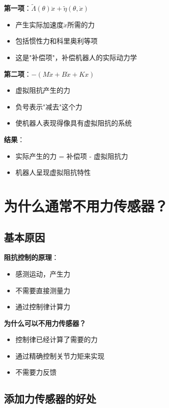 \documentclass[12pt,a4paper]{article}
\begin{document}
\textbf{第一项}：$\tilde{\Lambda}(\theta)\ddot{x} + \tilde{\eta}(\theta, \dot{x})$
\begin{itemize}
\item 产生实际加速度$\ddot{x}$所需的力
\item 包括惯性力和科里奥利等项
\item 这是"补偿项"，补偿机器人的实际动力学
\end{itemize}

\textbf{第二项}：$-(M\ddot{x} + B\dot{x} + Kx)$
\begin{itemize}
\item 虚拟阻抗产生的力
\item 负号表示"减去"这个力
\item 使机器人表现得像具有虚拟阻抗的系统
\end{itemize}

\textbf{结果}：
\begin{itemize}
\item 实际产生的力 = 补偿项 - 虚拟阻抗力
\item 机器人呈现虚拟阻抗特性
\end{itemize}

\section{为什么通常不用力传感器？}

\subsection{基本原因}

\textbf{阻抗控制的原理}：
\begin{itemize}
\item 感测运动，产生力
\item 不需要直接测量力
\item 通过控制律计算力
\end{itemize}

\textbf{为什么可以不用力传感器？}
\begin{itemize}
\item 控制律已经计算了需要的力
\item 通过精确控制关节力矩来实现
\item 不需要力反馈
\end{itemize}

\subsection{添加力传感器的好处}
\end{document}
